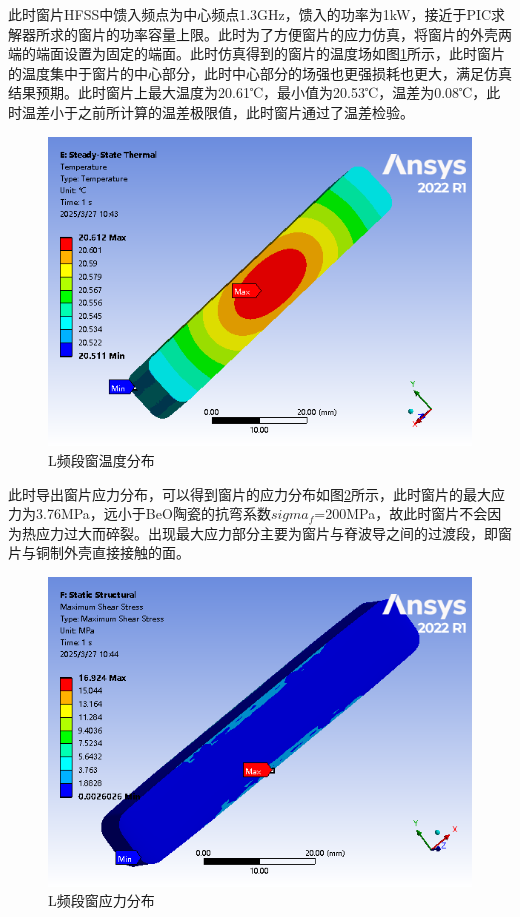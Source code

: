 \documentclass[master]{thesis-uestc}
\begin{document}
此时窗片HFSS中馈入频点为中心频点1.3GHz，馈入的功率为1kW，接近于PIC求解器所求的窗片的功率容量上限。此时为了方便窗片的应力仿真，将窗片的外壳两端的端面设置为固定的端面。此时仿真得到的窗片的温度场如图\ref{fig:L频段窗温度分布}所示，此时窗片的温度集中于窗片的中心部分，此时中心部分的场强也更强损耗也更大，满足仿真结果预期。此时窗片上最大温度为20.61℃，最小值为20.53℃，温差为0.08℃，此时温差小于之前所计算的温差极限值，此时窗片通过了温差检验。
\begin{figure}[!htb]
    \centering
    \includegraphics[width=0.5\linewidth]{pic/chapter4/L频段窗温度分布.png}
    \caption{L频段窗温度分布}
    \label{fig:L频段窗温度分布}
\end{figure}

此时导出窗片应力分布，可以得到窗片的应力分布如图\ref{fig:L频段窗应力分布}所示，此时窗片的最大应力为3.76MPa，远小于BeO陶瓷的抗弯系数\(sigma_f\)=200MPa，故此时窗片不会因为热应力过大而碎裂。出现最大应力部分主要为窗片与脊波导之间的过渡段，即窗片与铜制外壳直接接触的面。
\begin{figure}[!htb]
    \centering
    \includegraphics[width=0.5\linewidth]{pic/chapter4/L频段窗应力.png}
    \caption{L频段窗应力分布}
    \label{fig:L频段窗应力分布}
\end{figure}
\end{document}
